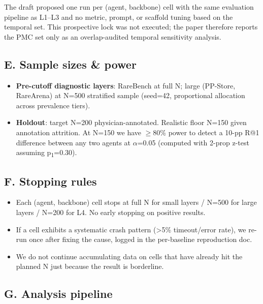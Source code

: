 The draft proposed one run per (agent, backbone) cell with the same evaluation
pipeline as L1--L3 and no metric, prompt, or scaffold tuning based on the
temporal set. This prospective lock was not executed; the paper therefore
reports the PMC set only as an overlap-audited temporal sensitivity analysis.

\subsection{E. Sample sizes \& power}\label{e.-sample-sizes-power}

\begin{itemize}
\tightlist
\item
  \textbf{Pre-cutoff diagnostic layers}: RareBench at full N; large
  (PP-Store, RareArena) at N=500 stratified sample (seed=42, proportional
  allocation across prevalence tiers).
\item
  \textbf{Holdout}: target N=200 physician-annotated. Realistic floor N=150
  given annotation attrition. At N=150 we have \ensuremath{\geq}80\% power to detect
  a 10-pp R@1 difference between any two agents at \ensuremath{\alpha}=0.05 (computed
  with 2-prop z-test assuming p\textsubscript{1}=0.30).
\end{itemize}

\subsection{F. Stopping rules}\label{f.-stopping-rules}

\begin{itemize}
\tightlist
\item
  Each (agent, backbone) cell stops at full N for small layers / N=500
  for large layers / N=200 for L4. No early stopping on positive results.
\item
  If a cell exhibits a systematic crash pattern (\textgreater5\% timeout/error
  rate), we re-run once after fixing the cause, logged in the
  per-baseline reproduction doc.
\item
  We do not continue accumulating data on cells that have already
  hit the planned N just because the result is borderline.
\end{itemize}

\subsection{G. Analysis pipeline}\label{g.-analysis-pipeline}

